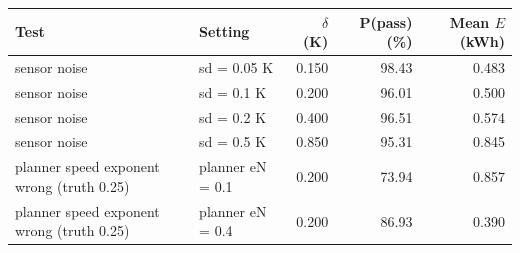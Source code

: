 \begin{tabular}{llrrr}
\toprule
Test & Setting & $\delta$ (K) & P(pass) (\%) & Mean $E$ (kWh) \\
\midrule
sensor noise & sd = 0.05 K & 0.150 & 98.43 & 0.483 \\
sensor noise & sd = 0.1 K & 0.200 & 96.01 & 0.500 \\
sensor noise & sd = 0.2 K & 0.400 & 96.51 & 0.574 \\
sensor noise & sd = 0.5 K & 0.850 & 95.31 & 0.845 \\
planner speed exponent wrong (truth 0.25) & planner eN = 0.1 & 0.200 & 73.94 & 0.857 \\
planner speed exponent wrong (truth 0.25) & planner eN = 0.4 & 0.200 & 86.93 & 0.390 \\
\bottomrule
\end{tabular}
